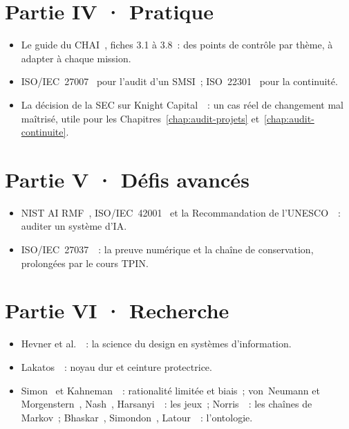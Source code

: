 \section*{Partie IV · Pratique}

\begin{itemize}
    \item Le guide du CHAI~\cite{chai2014guide}, fiches 3.1 à 3.8~: des
          points de contrôle par thème, à adapter à chaque mission.
    \item ISO/IEC~27007~\cite{iso27007_2020} pour l'audit d'un SMSI~;
          ISO~22301~\cite{iso22301_2019} pour la continuité.
    \item La décision de la SEC sur Knight Capital~\cite{sec2013knight}~: un
          cas réel de changement mal maîtrisé, utile pour les
          Chapitres~\ref{chap:audit-projets} et~\ref{chap:audit-continuite}.
\end{itemize}

\section*{Partie V · Défis avancés}

\begin{itemize}
    \item NIST AI RMF~\cite{nist2023airmf}, ISO/IEC~42001~\cite{iso42001_2023}
          et la Recommandation de l'UNESCO~\cite{unesco2021ethique}~: auditer
          un système d'IA.
    \item ISO/IEC~27037~\cite{iso27037_2012}~: la preuve numérique et la
          chaîne de conservation, prolongées par le cours TPIN.
\end{itemize}

\section*{Partie VI · Recherche}

\begin{itemize}
    \item Hevner et al.~\cite{hevner2004design}~: la science du design en
          systèmes d'information.
    \item Lakatos~\cite{lakatos1970}~: noyau dur et ceinture protectrice.
    \item Simon~\cite{simon1957} et Kahneman~\cite{kahneman2011}~:
          rationalité limitée et biais~; von~Neumann et
          Morgenstern~\cite{vonneumann1944}, Nash~\cite{nash1951},
          Harsanyi~\cite{harsanyi1967}~: les jeux~; Norris~\cite{norris1998}~:
          les chaînes de Markov~; Bhaskar~\cite{bhaskar1975},
          Simondon~\cite{simondon1958}, Latour~\cite{latour2005}~: l'ontologie.
\end{itemize}
